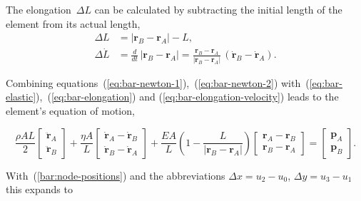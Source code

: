 The elongation~$\Delta L$ can be calculated by subtracting the initial length of the element from its actual length,
%
\begin{align}
\Delta L &= |\boldsymbol{r}_B - \boldsymbol{r}_A| - L,\label{eq:bar-elongation} \\
\Delta \dot{L} &= \frac{d}{dt}\,|\boldsymbol{r}_B - \boldsymbol{r}_A| = \frac{\boldsymbol{r}_B - \boldsymbol{r}_A}{|\boldsymbol{r}_B - \boldsymbol{r}_A|}\,(\dot{\boldsymbol{r}}_B - \dot{\boldsymbol{r}}_A).\label{eq:bar-elongation-velocity}
\end{align}

Combining equations~(\ref{eq:bar-newton-1}),~(\ref{eq:bar-newton-2}) with~(\ref{eq:bar-elastic}),~(\ref{eq:bar-elongation}) and (\ref{eq:bar-elongation-velocity}) leads to the element's equation of motion,

\begin{equation}
\frac{\rho A L}{2}
\begin{bmatrix}
\ddot{\boldsymbol{r}}_A \\ \ddot{\boldsymbol{r}}_B
\end{bmatrix}
+
\frac{\eta A}{L}
\begin{bmatrix}
\dot{\boldsymbol{r}}_A - \dot{\boldsymbol{r}}_B \\ \dot{\boldsymbol{r}}_B - \dot{\boldsymbol{r}}_A
\end{bmatrix}
+
\frac{EA}{L}\left( 1 - \frac{L}{|\boldsymbol{r}_B - \boldsymbol{r}_A|} \right)
\begin{bmatrix}
\boldsymbol{r}_A - \boldsymbol{r}_B \\ \boldsymbol{r}_B - \boldsymbol{r}_A
\end{bmatrix}
=
\begin{bmatrix}
\boldsymbol{p}_A \\ \boldsymbol{p}_B
\end{bmatrix}.
\end{equation}

With~(\ref{bar:node-positions}) and the abbreviations $\Delta x = u_{2} - u_{0}$, $\Delta y = u_{3} - u_{1}$ this expands to

